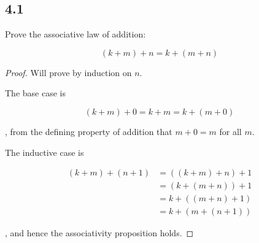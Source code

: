 \subsection*{4.1} Prove the associative law of addition:

$$ (k+m) + n = k+(m+n)$$

\begin{proof}
Will prove by induction on $n$.

The base case is

$$ (k+m)+0 = k+m = k+(m+0)$$

, from the defining property of addition that $m+0=m$ for all $m$.

The inductive case is

\begin{align*}
    (k+m)+(n+1) &= ((k+m) + n) + 1 \\
                &= (k+(m+n)) + 1 \\
                &= k + ((m+n) + 1) \\
                &= k + (m+(n+1))
\end{align*}

, and hence the associativity proposition holds.

\end{proof}

